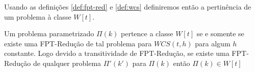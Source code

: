 Usando as definições \ref{def:fpt-red} e \ref{def:wcs} definiremos então a pertinência de um problema à classe $W[t]$.

\begin{definition}
 Um problema parametrizado $\Pi(k)$ pertence a classe $W[t]$ se e somente se existe uma FPT-Redução de tal problema para $WCS(t,h)$ para algum $h$ constante. Logo devido a transitividade de FPT-Redução, se existe uma FPT-Redução de qualquer problema $\Pi'(k')$ para $\Pi(k)$ então $\Pi(k) \in W[t]$
\end{definition}
